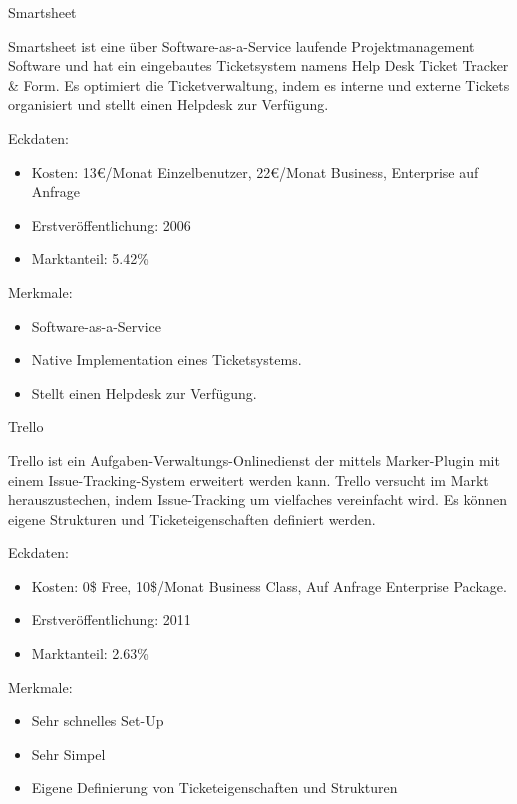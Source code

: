 				
				
				Smartsheet
				
				Smartsheet ist eine über Software-as-a-Service laufende Projektmanagement Software und hat ein eingebautes Ticketsystem namens Help Desk Ticket Tracker \& Form. Es optimiert die Ticketverwaltung, indem es interne und externe Tickets organisiert und stellt einen Helpdesk zur Verfügung. 
				
					Eckdaten:
				\begin{itemize}
					\item Kosten: 13€/Monat Einzelbenutzer, 22€/Monat Business, Enterprise auf Anfrage
					\item Erstveröffentlichung: 2006
					\item Marktanteil: 5.42\%
				\end{itemize}
				
				Merkmale:
				\begin{itemize}
					\item Software-as-a-Service
					\item Native Implementation eines Ticketsystems.
					\item Stellt einen Helpdesk zur Verfügung.
				\end{itemize}
				
				
				
				Trello
				
				Trello ist ein Aufgaben-Verwaltungs-Onlinedienst der mittels Marker-Plugin mit einem Issue-Tracking-System erweitert werden kann. Trello versucht im Markt herauszustechen, indem Issue-Tracking um vielfaches vereinfacht wird. Es können eigene Strukturen und Ticketeigenschaften definiert werden. 
				
					Eckdaten:
				\begin{itemize}
					\item Kosten: 0\$ Free, 10\$/Monat Business Class, Auf Anfrage Enterprise Package.
					\item Erstveröffentlichung: 2011
					\item Marktanteil: 2.63\%
				\end{itemize}
				
				Merkmale:
				\begin{itemize}
					\item Sehr schnelles Set-Up
					\item Sehr Simpel
					\item Eigene Definierung von Ticketeigenschaften und Strukturen
				\end{itemize}
				
				